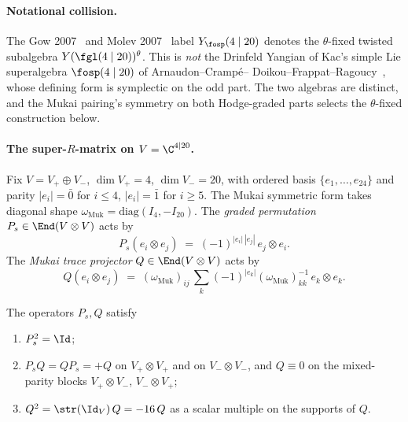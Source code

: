 \paragraph{Notational collision.}
The Gow 2007~\cite{Gow2007} and Molev 2007~\cite{Molev2007} label
$Y_{\fosp}(4 \mid 20)$ denotes the $\theta$-fixed twisted subalgebra
$Y(\fgl(4 \mid 20))^\theta$. This is \emph{not} the Drinfeld Yangian of
Kac's simple Lie superalgebra $\fosp(4 \mid 20)$ of Arnaudon--Cramp\'e--
Doikou--Frappat--Ragoucy~\cite{AcdfR2003}, whose defining form is
symplectic on the odd part. The two algebras are distinct, and the Mukai
pairing's symmetry on both Hodge-graded parts selects the $\theta$-fixed
construction below.

\paragraph{The super-$R$-matrix on $V = \C^{4 \mid 20}$.}
Fix $V = V_+ \oplus V_-$, $\dim V_+ = 4$, $\dim V_- = 20$, with ordered
basis $\{e_1, \ldots, e_{24}\}$ and parity $|e_i| = \bar 0$ for $i \leq 4$,
$|e_i| = \bar 1$ for $i \geq 5$. The Mukai symmetric form takes diagonal
shape $\omega_{\mathrm{Muk}} = \mathrm{diag}(I_4, -I_{20})$. The
\emph{graded permutation} $P_s \in \End(V \otimes V)$ acts by
\begin{equation}
 \label{eq:r10-graded-permutation-ch}
 P_s(e_i \otimes e_j)
 \;=\;
 (-1)^{|e_i|\,|e_j|}\, e_j \otimes e_i.
\end{equation}
The \emph{Mukai trace projector} $Q \in \End(V \otimes V)$ acts by
\begin{equation}
 \label{eq:r10-Q-projector-ch}
 Q(e_i \otimes e_j)
 \;=\;
 (\omega_{\mathrm{Muk}})_{ij}\, \sum_k (-1)^{|e_k|}
 (\omega_{\mathrm{Muk}})^{-1}_{kk}\, e_k \otimes e_k.
\end{equation}

\begin{proposition}
\label{prop:r10-Ps-Q-algebra-ch}
The operators $P_s, Q$ satisfy
\begin{enumerate}[label=\textup{(\arabic*)}]
\item $P_s^2 = \Id$;
\item $P_s Q = Q P_s = +Q$ on $V_+ \otimes V_+$ and on
 $V_- \otimes V_-$, and $Q \equiv 0$ on the mixed-parity blocks
 $V_+ \otimes V_-$, $V_- \otimes V_+$;
\item $Q^2 = \str(\Id_V)\, Q = -16\, Q$ as a scalar multiple on the
 supports of $Q$.
\end{enumerate}
\end{proposition}

